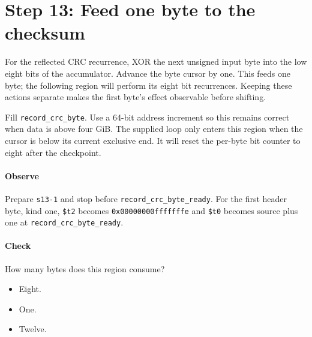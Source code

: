 \section{Step 13: Feed one byte to the checksum}
For the reflected CRC recurrence, XOR the next unsigned input byte into the
low eight bits of the accumulator. Advance the byte cursor by one. This feeds
one byte; the following region will perform its eight bit recurrences. Keeping
these actions separate makes the first byte's effect observable before shifting.

Fill \texttt{record\_crc\_byte}. Use a 64-bit address increment so this remains
correct when data is above four GiB. The supplied loop only enters this region
when the cursor is below its current exclusive end. It will reset the per-byte
bit counter to eight after the checkpoint.

\paragraph{Observe} Prepare \texttt{s13-1} and stop before
\texttt{record\_crc\_byte\_ready}. For the first header byte, kind one, \texttt{\$t2} becomes
\texttt{0x00000000fffffffe} and \texttt{\$t0} becomes source plus one at
\texttt{record\_crc\_byte\_ready}.

\paragraph{Check} How many bytes does this region consume?
\begin{itemize}
\item[A.] Eight.
\item[B.] One.
\item[C.] Twelve.
\end{itemize}
